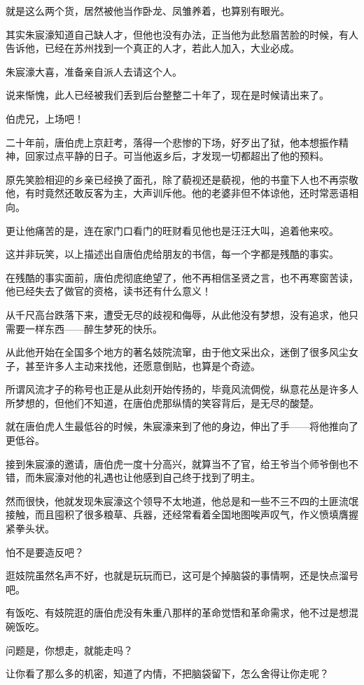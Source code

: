 \begin{multicols}{\theparacolNo}
就是这么两个货，居然被他当作卧龙、凤雏养着，也算别有眼光。

其实朱宸濠知道自己缺人才，但他也没有办法，正当他为此愁眉苦脸的时候，有人告诉他，已经在苏州找到一个真正的人才，若此人加入，大业必成。

朱宸濠大喜，准备亲自派人去请这个人。

说来惭愧，此人已经被我们丢到后台整整二十年了，现在是时候请出来了。

伯虎兄，上场吧！

二十年前，唐伯虎上京赶考，落得一个悲惨的下场，好歹出了狱，他本想振作精神，回家过点平静的日子。可当他返乡后，才发现一切都超出了他的预料。

原先笑脸相迎的乡亲已经换了面孔，除了藐视还是藐视，他的书童下人也不再崇敬他，有时竟然还敢反客为主，大声训斥他。他的老婆非但不体谅他，还时常恶语相向。

更让他痛苦的是，连在家门口看门的旺财看见他也是汪汪大叫，追着他来咬。

这并非玩笑，以上描述出自唐伯虎给朋友的书信，每一个字都是残酷的事实。

在残酷的事实面前，唐伯虎彻底绝望了，他不再相信圣贤之言，也不再寒窗苦读，他已经失去了做官的资格，读书还有什么意义！

从千尺高台跌落下来，遭受无尽的歧视和侮辱，从此他没有梦想，没有追求，他只需要一样东西——醉生梦死的快乐。

从此他开始在全国多个地方的著名妓院流窜，由于他文采出众，迷倒了很多风尘女子，甚至许多人主动来找他，还愿意倒贴，也算是个奇迹。

所谓风流才子的称号也正是从此刻开始传扬的，毕竟风流倜傥，纵意花丛是许多人所梦想的，但他们不知道，在唐伯虎那纵情的笑容背后，是无尽的酸楚。

就在唐伯虎人生最低谷的时候，朱宸濠来到了他的身边，伸出了手——将他推向了更低谷。

接到朱宸濠的邀请，唐伯虎一度十分高兴，就算当不了官，给王爷当个师爷倒也不错，而朱宸濠对他的礼遇也让他感到自己终于找到了明主。

然而很快，他就发现朱宸濠这个领导不太地道，他总是和一些不三不四的土匪流氓接触，而且囤积了很多粮草、兵器，还经常看着全国地图唉声叹气，作义愤填膺握紧拳头状。

怕不是要造反吧？

逛妓院虽然名声不好，也就是玩玩而已，这可是个掉脑袋的事情啊，还是快点溜号吧。

有饭吃、有妓院逛的唐伯虎没有朱重八那样的革命觉悟和革命需求，他不过是想混碗饭吃。

问题是，你想走，就能走吗？

让你看了那么多的机密，知道了内情，不把脑袋留下，怎么舍得让你走呢？


\end{multicols}
